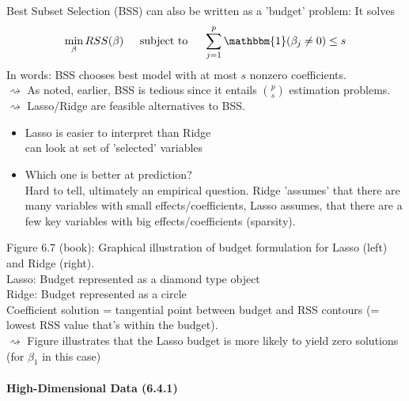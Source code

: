 \documentclass[11pt,a4paper,numbers=endperiod]{scrartcl}
\newcommand{\id}{\hspace*{4mm}}
\newcommand{\tit}[1]{\begin{large} \underline{\text{#1}}\end{large}}
\begin{document}
{Best Subset Selection (BSS) can also be written as a 'budget' problem: It solves \begin{align*}
	\min\limits_{\beta} RSS(\beta) \id \text{ subject to } \id \sum\limits_{j = 1}^p \mathbbm{1}(\beta_j \neq 0) \leq s
\end{align*}
In words: BSS chooses best model with at most $s$ nonzero coefficients.\\
$\rightsquigarrow$ As noted, earlier, BSS is tedious since it entails $\binom{p}{s}$ estimation problems.\\
$\rightsquigarrow$ Lasso/Ridge are feasible alternatives to BSS.\\
\newpage
\tit{Comparing Ridge and Lasso} \begin{itemize}
	\item Lasso is easier to interpret than Ridge\\
	 can look at set of 'selected' variables
	\item Which one is better at prediction?\\
	Hard to tell, ultimately an empirical question. Ridge 'assumes' that there are many variables with small effects/coefficients, Lasso assumes, that there are a few key variables with big effects/coefficients (sparsity).
\end{itemize}

Figure 6.7 (book): Graphical illustration of budget formulation for Lasso (left) and Ridge (right).\\
Lasso: Budget represented as a diamond type object\\
Ridge: Budget represented as a circle\\
Coefficient solution = tangential point between budget and RSS contours (= lowest RSS value that's within the budget).\\
$\rightsquigarrow$ Figure illustrates that the Lasso budget is more likely to yield zero solutions (for $\beta_1$ in this case) 

\paragraph{High-Dimensional Data (6.4.1)}

}
\end{document}

